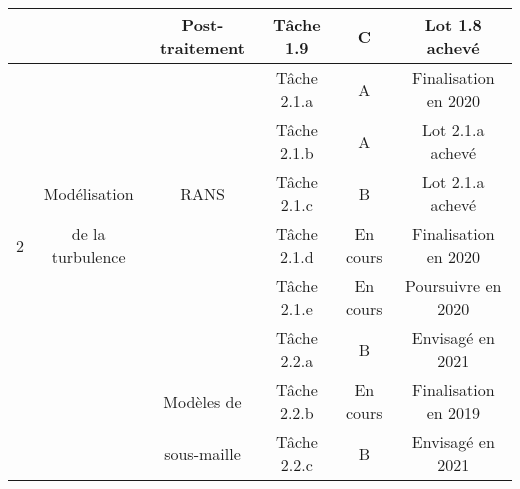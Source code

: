 \begin{center}
\begin{longtable}{|c|c|c|c|c|c|}
\cline{3-6}
& & Post-traitement & T\^ache 1.9 & C & Lot 1.8 achev\'e \\
\hline
 &    &  & T\^ache 2.1.a & A  &  Finalisation en 2020 \\
\cline{4-6}
&  &   & T\^ache 2.1.b &  A &  Lot 2.1.a achev\'e \\
\cline{4-6}
&Mod\'elisation & RANS & T\^ache 2.1.c & B  &  Lot 2.1.a achev\'e\\
\cline{4-6}
2&de  la turbulence & & T\^ache 2.1.d & En cours  & Finalisation en 2020 \\
\cline{4-6}
& & & T\^ache 2.1.e & En cours  & Poursuivre en 2020 \\
\cline{3-6}
&  &    & T\^ache 2.2.a &  B &   Envisag\'e en 2021\\
\cline{4-6}
& &Mod\`eles de& T\^ache 2.2.b & En cours  & Finalisation en 2019 \\
\cline{4-6}
& & sous-maille& T\^ache 2.2.c & B  &  Envisag\'e en 2021 \\
\hline


\end{longtable}
\end{center}

